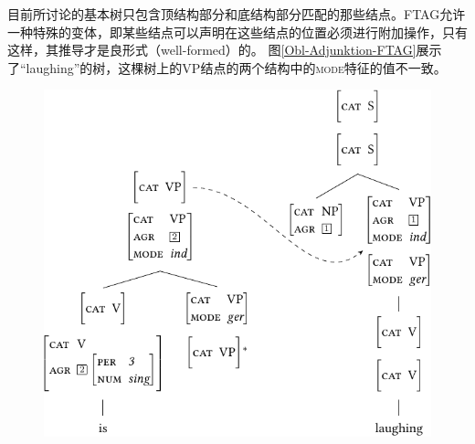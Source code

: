 目前所讨论的基本树只包含顶结构部分和底结构部分匹配的那些结点。FTAG允许一种特殊的变体，即某些结点可以声明在这些结点的位置必须进行附加操作，只有这样，其推导才是良形式（well-formed）的。
图\vref{Obl-Adjunktion-FTAG}展示了``laughing''的树，这棵树上的VP结点的两个结构中的\textsc{mode}特征的值不一致。
\begin{figure}
\centerline{%
\includegraphics{Figures/tag-obl-adj-ftag-cropped}
}

\end{figure}
